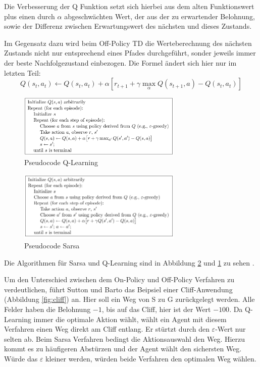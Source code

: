 \documentclass[10pt]{scrartcl}
\begin{document}
Die Verbesserung der Q Funktion setzt sich hierbei aus dem alten Funktionswert plus einen durch $\alpha$ abgeschwächten Wert, der aus der zu erwartender Belohnung, sowie der Differenz zwischen Erwartungswert des nächsten und dieses Zustands.

Im Gegensatz dazu wird beim Off-Policy TD die Werteberechnung des nächsten Zustands nicht nur entsprechend eines Pfades durchgeführt, sonder jeweils immer der beste Nachfolgezustand einbezogen. 
Die Formel ändert sich hier nur im letzten Teil:
\begin{equation}
Q(s_t,a_t) \leftarrow Q(s_t,a_t) + \alpha[r_{t+1}+\gamma  \max_\alpha Q(s_{t+1},a)- Q(s_t,a_t)]
\end{equation}

\begin{figure}[htc]
    \centering
    \includegraphics[width=0.7\textwidth]{Grafiken/ql.png}
    \caption{Pseudocode Q-Learning}
    \label{fig:qlearning}
\end{figure}

\begin{figure}[htc]
    \centering
    \includegraphics[width=0.7\textwidth]{Grafiken/sarsa.png}
    \caption{Pseudocode Sarsa}
    \label{fig:sarsa}
\end{figure}

Die Algorithmen für Sarsa und Q-Learning sind in Abbildung \ref{fig:sarsa} und \ref{fig:qlearning} zu sehen \cite{krl}.

Um den Unterschied zwischen dem On-Policy und Off-Policy Verfahren zu verdeutlichen, führt Sutton und Barto \cite{rli} das Beipsiel einer Cliff-Anwendung (Abbildung \ref{fig:cliff}) an. Hier soll ein Weg von S zu G zurückgelegt werden. Alle Felder haben die Belohnung $-1$, bis auf das Cliff, hier ist der Wert $-100$. Da Q-Learning immer die optimale Aktion wählt, wählt ein Agent mit diesem Verfahren einen Weg direkt am Cliff entlang. Er stürtzt durch den $\varepsilon$-Wert nur selten ab. Beim Sarsa Verfahren bedingt die Aktionsauswahl den Weg. Hierzu kommt es zu häufigeren Abstürzen und der Agent wählt den sichersten Weg. Würde das $\varepsilon$ kleiner werden, würden beide Verfahren den optimalen Weg wählen.
\end{document}
